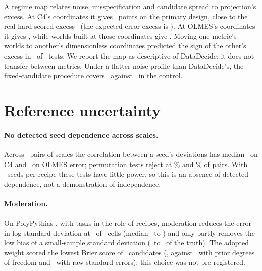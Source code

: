 A regime map relates noise, misspecification and candidate spread to
projection's excess. At C4's coordinates it gives \mapExcessCFourPrimary\
points on the primary design, close to the real hard-scored excess
\excessObserved\ (the expected-error excess is \headEstimate). At OLMES's
coordinates it gives \mapExcessOlmesPrimary, while worlds built at those
coordinates give \worldExcessOlmesPrimary. Moving one metric's worlds to
another's dimensionless coordinates predicted the sign of the other's excess in
\transferMatchesBase\ of \transferTestsBase\ tests. We report the map as
descriptive of DataDecide; it does not transfer between metrics. Under a flatter noise profile than DataDecide's, the
fixed-candidate procedure covers \calFlatFixedCov\ against
\calControlFixedCov\ in the control.

\FloatBarrier
\section{Reference uncertainty}
\label{app:reference}

\paragraph{No detected seed dependence across scales.} Across \couplingPairs\ pairs
of scales the correlation between a seed's deviations has median
\couplingMedianCFour\ on C4 and \couplingMedianErr\ on OLMES error; permutation
tests reject at \couplingRejectCFour\% and \couplingRejectErr\% of pairs. With
\ddSeeds\ seeds per recipe these tests have little power, so this is an
absence of detected dependence, not a demonstration of independence.

\paragraph{Moderation.} On PolyPythias \citep{vanderwal2025polypythias}, with
tasks in the role of recipes, moderation reduces the error in log standard
deviation at \polyBetter\ of \polyCells\ cells (median \polyRmseRaw\ to
\polyRmseMod) and only partly removes the low bias of a small-sample standard
deviation (\polyRatioRaw\ to \polyRatioMod\ of the truth). The adopted weight
scored the lowest Brier score of \ppWeights\ candidates (\brierAdopted, against
\brierModT\ with prior degrees of freedom and \brierRaw\ with raw standard
errors); this choice was not pre-registered.

